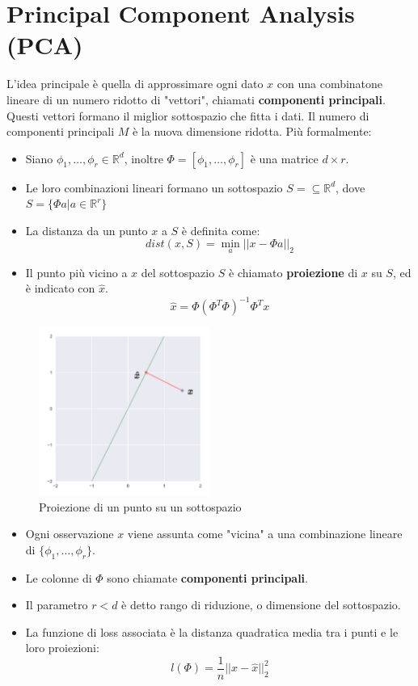 \section{Principal Component Analysis (PCA)}
L'idea principale è quella di approssimare ogni dato $x$ con una combinatone lineare di un numero ridotto di "vettori", chiamati \textbf{componenti principali}.
Questi vettori formano il miglior sottospazio che fitta i dati. Il numero di componenti principali $M$ è la nuova dimensione ridotta.
Più formalmente:
\begin{itemize}
	\item Siano $\phi_1, \ldots, \phi_r\in\mathbb{R}^d$, inoltre $\Phi=[\phi_1, \ldots, \phi_r]$ è una matrice $d\times r$. 
	\item Le loro combinazioni lineari formano un sottospazio $S=\subseteq \mathbb{R}^d$, dove $S=\{\Phi a | a\in\mathbb{R}^r\}$
	\item La distanza da un punto $x$ a $S$ è definita come: \[dist(x, S)= \min_{a} ||x-\Phi a ||_2\]
	\item Il punto più vicino a $x$ del sottospazio $S$ è chiamato \textbf{proiezione} di $x$ su $S$, ed è indicato con $\hat{x}$.
	\[\hat{x}=\Phi (\Phi^T\Phi)^{-1}\Phi^T x\]
\end{itemize}
\begin{figure}[H]
	\centering
	\includegraphics[width=0.5\textwidth]{pictures/proiezione.png}
	\caption{Proiezione di un punto su un sottospazio}
\end{figure}
\begin{itemize}
	\item Ogni osservazione $x$ viene assunta come "vicina" a una combinazione lineare di $\{\phi_1, \ldots, \phi_r\}$.
	\item Le colonne di $\Phi$ sono chiamate \textbf{componenti principali}.
	\item Il parametro $r<d$ è detto rango di riduzione, o dimensione del sottospazio.
	\item La funzione di loss associata è la distanza quadratica media tra i punti e le loro proiezioni:
	\[l(\Phi)=\frac{1}{n}||x-\hat{x}||_2^2\]
\end{itemize}
